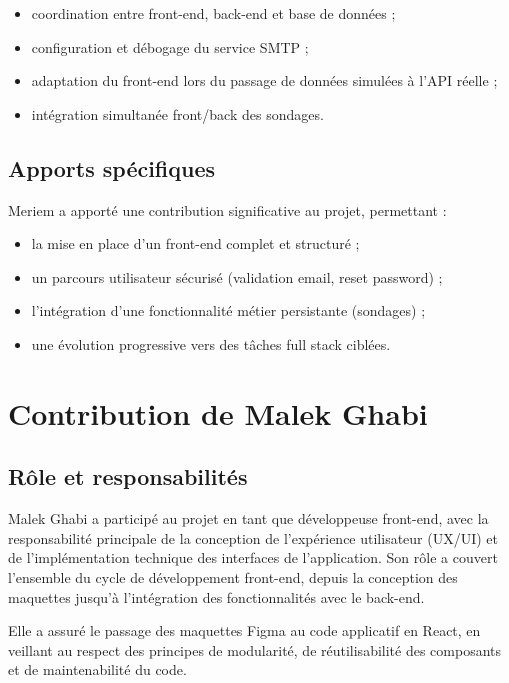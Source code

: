 \documentclass[12pt,a4paper]{report}
\begin{document}
\begin{itemize}
  \item coordination entre front-end, back-end et base de données ;
  \item configuration et débogage du service SMTP ;
  \item adaptation du front-end lors du passage de données simulées à l’API réelle ;
  \item intégration simultanée front/back des sondages.
\end{itemize}

\subsection*{Apports spécifiques}

Meriem a apporté une contribution significative au projet, permettant :
\begin{itemize}
  \item la mise en place d’un front-end complet et structuré ;
  \item un parcours utilisateur sécurisé (validation email, reset password) ;
  \item l’intégration d’une fonctionnalité métier persistante (sondages) ;
  \item une évolution progressive vers des tâches full stack ciblées.
\end{itemize}



\section{Contribution de Malek Ghabi}

\subsection*{Rôle et responsabilités}

Malek Ghabi a participé au projet en tant que développeuse front-end, avec la responsabilité principale de la conception de l’expérience utilisateur (UX/UI) et de l’implémentation technique des interfaces de l’application. Son rôle a couvert l’ensemble du cycle de développement front-end, depuis la conception des maquettes jusqu’à l’intégration des fonctionnalités avec le back-end.

Elle a assuré le passage des maquettes Figma au code applicatif en React, en veillant au respect des principes de modularité, de réutilisabilité des composants et de maintenabilité du code.
\end{document}

